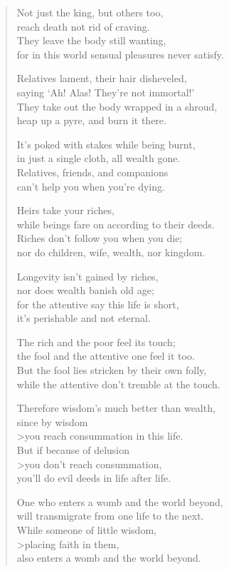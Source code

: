 \documentclass[12pt,openany]{book}%
\begin{document}
\begin{verse}
Not just the king, but others too, \\
reach death not rid of craving. \\
They leave the body still wanting, \\
for in this world sensual pleasures never satisfy. 

Relatives lament, their hair disheveled, \\
saying ‘Ah! Alas! They’re not immortal!’ \\
They take out the body wrapped in a shroud, \\
heap up a pyre, and burn it there. 

It’s poked with stakes while being burnt, \\
in just a single cloth, all wealth gone. \\
Relatives, friends, and companions \\
can’t help you when you’re dying. 

Heirs take your riches, \\
while beings fare on according to their deeds. \\
Riches don’t follow you when you die; \\
nor do children, wife, wealth, nor kingdom. 

Longevity isn’t gained by riches, \\
nor does wealth banish old age; \\
for the attentive say this life is short, \\
it’s perishable and not eternal. 

The rich and the poor feel its touch; \\
the fool and the attentive one feel it too. \\
But the fool lies stricken by their own folly, \\
while the attentive don’t tremble at the touch. 

Therefore wisdom’s much better than wealth, \\
since by wisdom \\>you reach consummation in this life. \\
But if because of delusion \\>you don’t reach consummation, \\
you’ll do evil deeds in life after life. 

One who enters a womb and the world beyond, \\
will transmigrate from one life to the next. \\
While someone of little wisdom, \\>placing faith in them, \\
also enters a womb and the world beyond. 


\end{verse}
\end{document}
